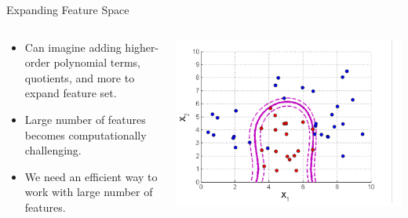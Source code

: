 \begin{frame}{Expanding Feature Space}
    \begin{columns}
        \begin{column}{0.5\textwidth}
            \begin{itemize}
                \item Can imagine adding higher-order polynomial terms, quotients, and more to expand feature set.
                \item Large number of features becomes computationally challenging.
                \item We need an efficient way to work with large number of features.
            \end{itemize}
        \end{column}
        \begin{column}{0.5\textwidth}
            \includegraphics[width=\textwidth]{images/support-vector-machines/support-vector-machines-20.png}
        \end{column}
    \end{columns}
\end{frame}



